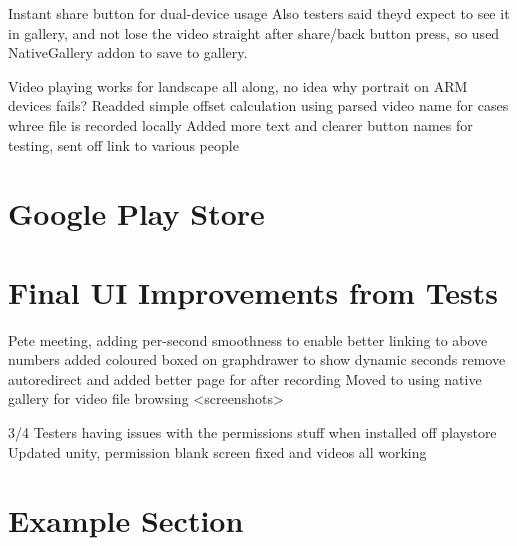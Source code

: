 Instant share button for dual-device usage
Also testers said theyd expect to see it in gallery, and not lose the video straight after share/back button press, so used NativeGallery addon to save to gallery.

 Video playing works for landscape all along, no idea why portrait on ARM devices fails?
Readded simple offset calculation using parsed video name for cases whree file is recorded locally
Added more text and clearer button names for testing, sent off link to various people




\section{Google Play Store}




\section{Final UI Improvements from Tests}
Pete meeting, adding per-second smoothness to enable better linking to above numbers
added coloured boxed on graphdrawer to show dynamic seconds
remove autoredirect and added better page for after recording
Moved to using native gallery for video file browsing
<screenshots>


3/4
Testers having issues with the permissions stuff when installed off playstore
Updated unity, permission blank screen fixed and videos all working









































\section{Example Section}

